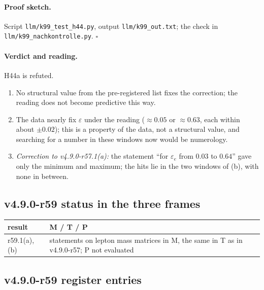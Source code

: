 \paragraph{Proof sketch.}
Script \texttt{llm/k99\_test\_h44.py}, output \texttt{llm/k99\_out.txt}; the check in \texttt{llm/k99\_nachkontrolle.py}.  \(\square\)

\paragraph{Verdict and reading.}
H44a is refuted.
\begin{enumerate}[leftmargin=2em]
\item No structural value from the pre-registered list fixes the correction; the reading does not become predictive this way.
\item The data nearly fix \(\varepsilon\) under the reading (\(\approx0.05\) or \(\approx0.63\), each within about \(\pm0.02\)); this is a property of the data, not a structural
value, and searching for a number in these windows now would be numerology.
\item \emph{Correction to v4.9.0-r57.1(a):} the statement ``for \(\varepsilon_e\) from \(0.03\) to \(0.64\)'' gave only the minimum and maximum; the hits lie in the two windows
of (b), with none in between.
\end{enumerate}

\subsection*{v4.9.0-r59 status in the three frames}
\label{subsec:v490-r59-frames}

\begin{center}
\small
\begin{tabular}{@{}>{\raggedright\arraybackslash}p{}>{\raggedright\arraybackslash}p{}@{}}
\toprule
result & M / T / P\\
\midrule
r59.1(a), (b) & statements on lepton mass matrices in M, the same in T as in v4.9.0-r57; P not evaluated\\
\bottomrule
\end{tabular}
\end{center}

\subsection*{v4.9.0-r59 register entries}
\label{subsec:v490-r59-register}

